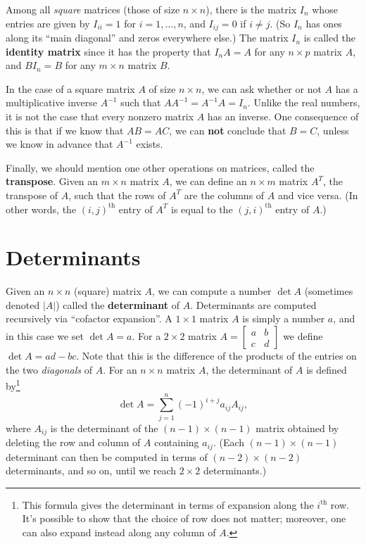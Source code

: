 \documentclass[12pt,letterpaper]{article}
\newcommand{\di}{\displaystyle}
\begin{document}
Among all {\em square} matrices (those of size $n\times n$), there is the matrix $I_n$ whose entries are given by $I_{ii}=1$ for $i=1,\ldots, n$, and $I_{ij}=0$ if $i\neq j$. (So $I_n$ has ones along its ``main diagonal'' and zeros everywhere else.) The matrix $I_n$ is called the {\bf identity matrix} since it has the property that $I_nA = A$ for any $n\times p$ matrix $A$, and $BI_n=B$ for any $m\times n$ matrix $B$. 

In the case of a square matrix $A$ of size $n\times n$, we can ask whether or not $A$ has a multiplicative inverse $A^{-1}$ such that $AA^{-1} = A^{-1}A=I_n$. Unlike the real numbers, it is not the case that every nonzero matrix $A$ has an inverse. One consequence of this is that if we know that $AB=AC$, we can {\bf not} conclude that $B=C$, unless we know in advance that $A^{-1}$ exists.

Finally, we should mention one other operations on matrices, called the {\bf transpose}. Given an $m\times n$ matrix $A$, we can define an $n\times m$ matrix $A^T$, the transpose of $A$, such that the rows of $A^T$ are the columns of $A$ and vice versa. (In other words, the $(i,j)^{\mathrm{th}}$ entry of $A^T$ is equal to the $(j,i)^{\mathrm{th}}$ entry of $A$.)

\section{Determinants}
Given an $n\times n$ (square) matrix $A$, we can compute a number $\det A$ (sometimes denoted $\lvert A\rvert$) called the {\bf determinant} of $A$. Determinants are computed recursively via ``cofactor expansion''. A $1\times 1$ matrix $A$ is simply a number $a$, and in this case we set $\det A =a$. For a $2\times 2$ matrix $\di A=\begin{bmatrix} a&b\\c&d\end{bmatrix}$ we define $\det A = ad-bc$. Note that this is the difference of the products of the entries on the two {\em diagonals} of $A$. For an $n\times n$ matrix $A$, the determinant of $A$ is defined by\footnote{This formula gives the determinant in terms of expansion along the $i^{\mathrm{th}}$ row. It's possible to show that the choice of row does not matter; moreover, one can also expand instead along any column of $A$.}
\[
\det A = \sum_{j=1}^n (-1)^{i+j}a_{ij}A_{ij},
\]
where $A_{ij}$ is the determinant of the $(n-1)\times (n-1)$ matrix obtained by deleting the row and column of $A$ containing $a_{ij}$. (Each $(n-1)\times (n-1)$ determinant can then be computed in terms of $(n-2)\times (n-2)$ determinants, and so on, until we reach $2\times 2$ determinants.)
\end{document}

